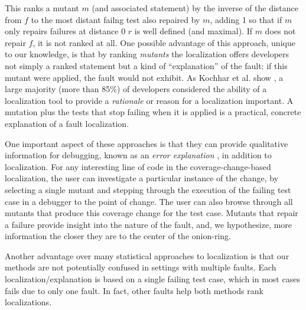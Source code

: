 This ranks a mutant $m$ (and associated statement) by the inverse of the distance
from $f$ to the most distant failng test also repaired by $m$, adding 1
so that if $m$ only repairs failures at distance 0 $r$ is well defined
(and maximal).
If $m$ does not repair $f$, it is not ranked at all.  One possible
advantage of this approach, unique to our knowledge, is that by
ranking \emph{mutants} the localization offers developers not simply a
ranked statement but a kind of ``explanation'' of the fault:  if this
mutant were applied, the fault would not exhibit.  As Kochhar et
al. show \cite{Kochhar}, a large majority (more than 85\%) of developers considered
the ability of a localization tool to provide a \emph{rationale} or
reason for a localization important.  A mutation plus the tests that
stop failing when it is applied is a practical, concrete explanation
of a fault localization.

One important aspect of these approaches is that they 
can provide qualitative information for debugging, known as an \emph{error
  explanation} \cite{GroceError}, in addition to localization.  For any
interesting line of code in the coverage-change-based localization,
the user can investigate a particular instance of the change,
by selecting a single mutant and stepping through the execution of the
failing test case in a debugger to the point of change.  The user can also
browse through all mutants that produce this coverage change for the test
case.  Mutants that repair a failure provide insight
into the nature of the fault, and, we hypothesize, more information the
closer they are to the center of the onion-ring.

Another advantage over many statistical approaches to
localization is that our methods are not potentially confused in
settings with multiple faults.  Each localization/explanation is based
on a single failing test case, which in most cases fails due to only one
fault.  In fact, other faults help both methods rank localizations.